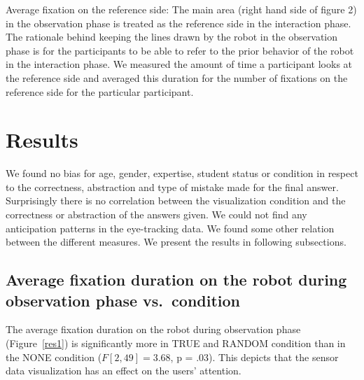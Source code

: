 \documentclass{sig-alternate}
\begin{document}
Average fixation on the reference side: The main area (right hand side
of figure 2) in the observation phase is treated as the reference side
in the interaction phase. The rationale behind keeping the lines drawn
by the robot in the observation phase is for the participants to be able
to refer to the prior behavior of the robot in the interaction phase. We
measured the amount of time a participant looks at the reference side
and averaged this duration for the number of fixations on the reference
side for the particular participant.


\section{Results}

We found no bias for age, gender, expertise, student status or condition
in respect to the correctness, abstraction and type of mistake made for
the final answer. Surprisingly there is no correlation between the
visualization condition and the correctness or abstraction of the
answers given. We could not find any anticipation patterns in the
eye-tracking data. We found some other relation between the different
measures. We present the results in following subsections.

\subsection{Average fixation duration on the robot during observation phase
vs.~condition}

The average fixation duration on the robot during observation phase
(Figure~\ref{res1}) is significantly more in TRUE and RANDOM condition than in
the NONE condition ($F[2,49]=3.68$, p = .03). This depicts that the
sensor data visualization has an effect on the users' attention.
\end{document}
